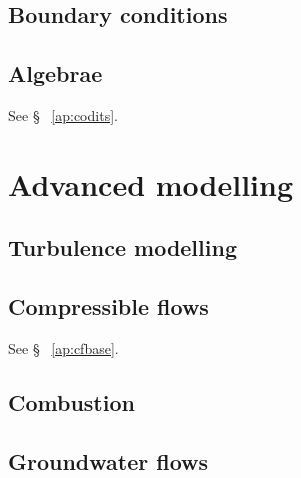 \documentclass[a4paper,10pt,twoside]{csdoc}
\begin{document}
\chapter{Boundary conditions}\label{chapter:bndcnd}




\chapter{Algebrae}
See \S~ \ref{ap:codits}.


\part{Advanced modelling}

\setcounter{section}{0}
\setcounter{equation}{0}
\setcounter{figure}{0}

\chapter{Turbulence modelling}\label{chapter:turbul}


\chapter{Compressible flows}
See \S~ \ref{ap:cfbase}.


\chapter{Combustion}






\chapter{Groundwater flows}

\end{document}
